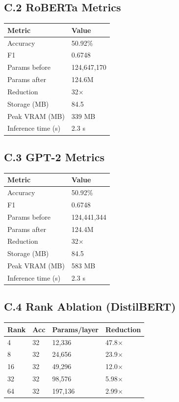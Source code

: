 \subsection{C.2 RoBERTa Metrics}

\begin{table}[H]
\centering
\small
\begin{tabular}{ll}
\toprule
\textbf{Metric} & \textbf{Value} \\
\midrule
Accuracy & 50.92\% \\
F1 & 0.6748 \\
Params before & 124,647,170 \\
Params after & 124.6M \\
Reduction & 32$\times$ \\
Storage (MB) & 84.5 \\
Peak VRAM (MB) & 339 MB \\
Inference time (s) & 2.3 s \\
\bottomrule
\end{tabular}
\end{table}

\subsection{C.3 GPT-2 Metrics}

\begin{table}[H]
\centering
\small
\begin{tabular}{ll}
\toprule
\textbf{Metric} & \textbf{Value} \\
\midrule
Accuracy & 50.92\% \\
F1 & 0.6748 \\
Params before & 124,441,344 \\
Params after & 124.4M \\
Reduction & 32$\times$ \\
Storage (MB) & 84.5 \\
Peak VRAM (MB) & 583 MB \\
Inference time (s) & 2.3 s \\
\bottomrule
\end{tabular}
\end{table}

\subsection{C.4 Rank Ablation (DistilBERT)}

\begin{table}[H]
\centering
\small
\begin{tabular}{llll}
\toprule
\textbf{Rank} & \textbf{Acc} & \textbf{Params/layer} & \textbf{Reduction} \\
\midrule
4 & 32 & 12,336 & 47.8$\times$ \\
8 & 32 & 24,656 & 23.9$\times$ \\
16 & 32 & 49,296 & 12.0$\times$ \\
32 & 32 & 98,576 & 5.98$\times$ \\
64 & 32 & 197,136 & 2.99$\times$ \\
\bottomrule
\end{tabular}
\end{table}

